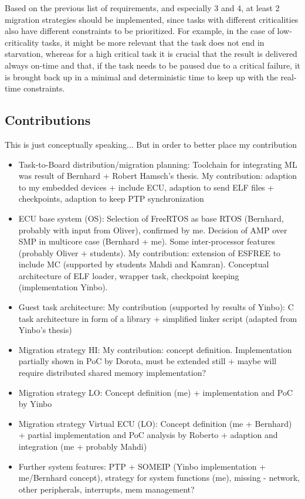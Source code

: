 Based on the previous list of requirements, and especially 3 and 4, at least 2 migration strategies should be implemented, since tasks with different criticalities also have different constraints to be prioritized. For example, in the case of low-criticality tasks, it might be more relevant that the task does not end in starvation, whereas for a high critical task it is crucial that the result is delivered always on-time and that, if the task needs to be paused due to a critical failure, it is brought back up in a minimal and deterministic time to keep up with the real-time constraints.

\subsection{Contributions}
This is just conceptually speaking... But in order to better place my contribution

\begin{itemize}
	\item Task-to-Board distribution/migration planning: Toolchain for integrating ML was result of Bernhard + Robert Hamsch's thesis. My contribution: adaption to my embedded devices + include ECU, adaption to send ELF files + checkpoints, adaption to keep PTP synchronization
	\item ECU base system (OS): Selection of FreeRTOS as base RTOS (Bernhard, probably with input from Oliver), confirmed by me. Decision of AMP over SMP in multicore case (Bernhard + me). Some inter-processor features (probably Oliver + students). My contribution: extension of ESFREE to include MC (supported by students Mahdi and Kamran). Conceptual architecture of ELF loader, wrapper task, checkpoint keeping (implementation Yinbo).
	\item Guest task architecture: My contribution (supported by results of Yinbo): C task architecture in form of a library + simplified linker script (adapted from Yinbo's thesis)
	\item Migration strategy HI: My contribution: concept definition. Implementation partially shown in PoC by Dorota, must be extended still + maybe will require distributed shared memory implementation?
	\item Migration strategy LO: Concept definition (me) + implementation and PoC by Yinbo
	\item Migration strategy Virtual ECU (LO): Concept definition (me + Bernhard) + partial implementation and PoC analysis by Roberto + adaption and integration (me + probably Mahdi)
	\item Further system features: PTP + SOMEIP (Yinbo implementation + me/Bernhard concept), strategy for system functions (me), missing - network, other peripherals, interrupts, mem management? 
\end{itemize}


